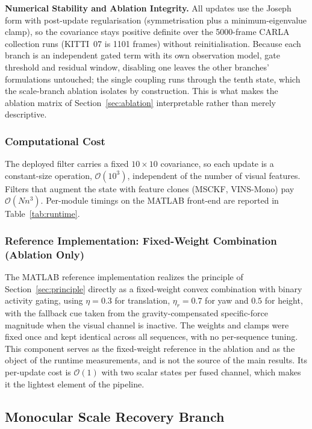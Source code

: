 \textbf{Numerical Stability and Ablation Integrity.} All updates use the Joseph form with post-update regularisation (symmetrisation plus a minimum-eigenvalue clamp), so the covariance stays positive definite over the 5000-frame CARLA collection runs (KITTI~07 is 1101 frames) without reinitialisation. Because each branch is an independent gated term with its own observation model, gate threshold and residual window, disabling one leaves the other branches' formulations untouched; the single coupling runs through the tenth state, which the scale-branch ablation isolates by construction. This is what makes the ablation matrix of Section~\ref{sec:ablation} interpretable rather than merely descriptive.

\subsubsection{Computational Cost}
\label{sec:cost}

The deployed filter carries a fixed $10\times10$ covariance, so each update is a constant-size operation, $\mathcal{O}(10^{3})$, independent of the number of visual features. Filters that augment the state with feature clones (MSCKF, VINS-Mono) pay $\mathcal{O}(Nn^{3})$. Per-module timings on the MATLAB front-end are reported in Table~\ref{tab:runtime}.

\subsubsection{Reference Implementation: Fixed-Weight Combination (Ablation Only)}
\label{sec:reference_impl}

The MATLAB reference implementation realizes the principle of Section~\ref{sec:principle} directly as a fixed-weight convex combination with binary activity gating, using $\eta=0.3$ for translation, $\eta_r=0.7$ for yaw and $0.5$ for height, with the fallback cue taken from the gravity-compensated specific-force magnitude when the visual channel is inactive. The weights and clamps were fixed once and kept identical across all sequences, with no per-sequence tuning. This component serves as the fixed-weight reference in the ablation and as the object of the runtime measurements, and is not the source of the main results. Its per-update cost is $\mathcal{O}(1)$ with two scalar states per fused channel, which makes it the lightest element of the pipeline.

\subsection{Monocular Scale Recovery Branch}
\label{sec:scale_recovery}

